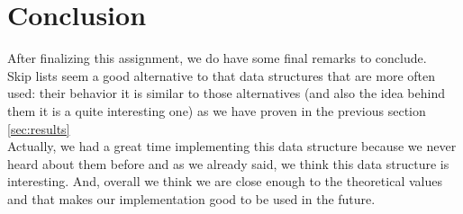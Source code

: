 \documentclass{article}
\begin{document}
\newpage
\section{Conclusion}
After finalizing this assignment, we do have some final remarks to conclude.\\
Skip lists seem a good alternative to that data structures that are more often used: their behavior it is similar to those alternatives (and also the idea behind them it is a quite interesting one) as we have proven in the previous section \ref{sec:results}\\
Actually, we had a great time implementing this data structure because we never heard about them before and as we already said, we think this data structure is interesting.
And, overall we think we are close enough to the theoretical values and that makes our implementation good to be used in the future.





\newpage

\appendix

\end{document}
